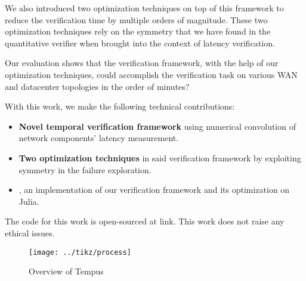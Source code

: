 We also introduced two optimization techniques on top of this framework to reduce the verification time 
by multiple orders of magnitude.
These two optimization techniques rely on the symmetry that we have found in the quantitative verifier 
when brought into the context of latency verification.

Our evaluation shows that the verification framework, with the help of our optimization techniques, 
could accomplish the verification task on various WAN and datacenter topologies in the order of 
minutes?

With this work, we make the following technical contributions:
\begin{itemize}
    \item \textbf{Novel temporal verification framework} using numerical convolution of network 
        components' latency measurement.
    \item \textbf{Two optimization techniques} in said verification framework by exploiting 
        symmetry in the failure exploration.
    \item \textbf{\tool}, an implementation of our verification framework and its optimization 
        on Julia.
\end{itemize}

The code for this work is open-sourced at link. %
This work does not raise any ethical issues.

\begin{figure*}[h]
    \centering
    \texttt{[image: ../tikz/process]}
    \caption{Overview of Tempus}
    \label{fig:process}
\end{figure*}